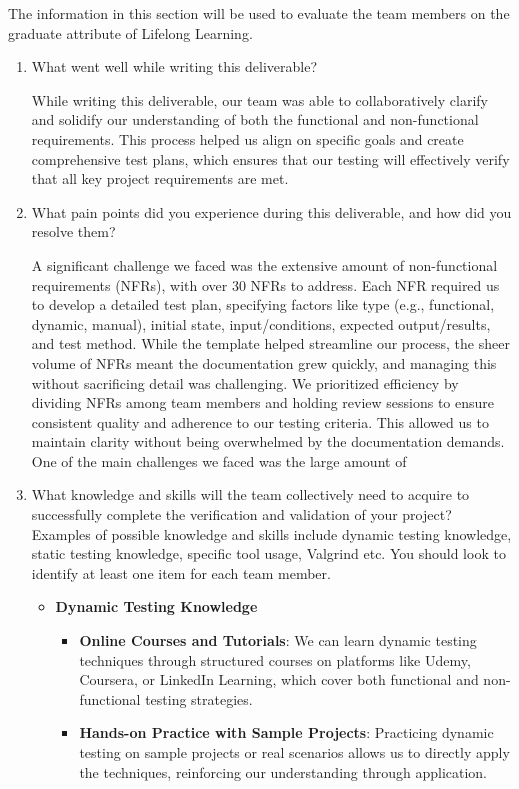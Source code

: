 \documentclass[12pt, titlepage]{article}
\begin{document}

The information in this section will be used to evaluate the team members on the
graduate attribute of Lifelong Learning.



\begin{enumerate}
  \item What went well while writing this deliverable? 

  While writing this deliverable, our team was able to collaboratively clarify and solidify 
  our understanding of both the functional and non-functional requirements. This process helped us align on 
  specific goals and create comprehensive test plans, which ensures that our testing will effectively verify 
  that all key project requirements are met.

  \item What pain points did you experience during this deliverable, and how
    did you resolve them?

  A significant challenge we faced was the extensive amount of non-functional requirements (NFRs), 
  with over 30 NFRs to address. Each NFR required us to develop a detailed test plan, specifying 
  factors like type (e.g., functional, dynamic, manual), initial state, input/conditions, expected 
  output/results, and test method. While the template helped streamline our process, the sheer volume 
  of NFRs meant the documentation grew quickly, and managing this without sacrificing detail was challenging. 
  We prioritized efficiency by dividing NFRs among team members and holding review sessions to ensure consistent 
  quality and adherence to our testing criteria. This allowed us to maintain clarity without being overwhelmed by 
  the documentation demands.
  One of the main challenges we faced was the large amount of 
  \item What knowledge and skills will the team collectively need to acquire to
  successfully complete the verification and validation of your project?
  Examples of possible knowledge and skills include dynamic testing knowledge,
  static testing knowledge, specific tool usage, Valgrind etc.  You should look to
  identify at least one item for each team member.
  \begin{itemize}
    \item \textbf{Dynamic Testing Knowledge}
    \begin{itemize}
        \item \textbf{Online Courses and Tutorials}: We can learn dynamic testing techniques through structured courses on platforms like Udemy, Coursera, or LinkedIn Learning, which cover both functional and non-functional testing strategies.
        \item \textbf{Hands-on Practice with Sample Projects}: Practicing dynamic testing on sample projects or real scenarios allows us to directly apply the techniques, reinforcing our understanding through application.
    \end{itemize}


\end{itemize}
\end{enumerate}
\end{document}
